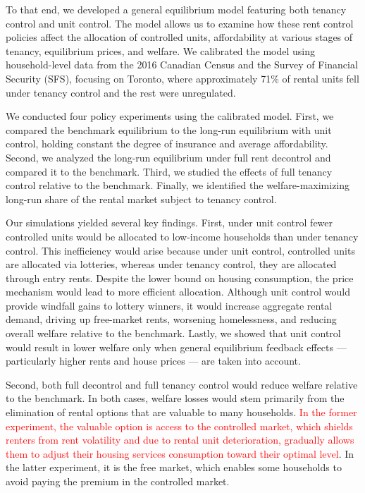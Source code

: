 \documentclass[parskip=full]{article}
\begin{document}
To that end, we developed a general equilibrium model featuring both tenancy control and unit control. The model allows us to examine how these rent control policies affect the allocation of controlled units, affordability at various stages of tenancy, equilibrium prices, and welfare. We calibrated the model using household-level data from the 2016 Canadian Census and the Survey of Financial Security (SFS), focusing on Toronto, where approximately 71\% of rental units fell under tenancy control and the rest were unregulated.

We conducted four policy experiments using the calibrated model. First, we compared the benchmark equilibrium to the long-run equilibrium with unit control, holding constant the degree of insurance and average affordability. Second, we analyzed the long-run equilibrium under full rent decontrol and compared it to the benchmark. Third, we studied the effects of full tenancy control relative to the benchmark. Finally, we identified the welfare-maximizing long-run share of the rental market subject to tenancy control.

Our simulations yielded several key findings. First, under unit control fewer controlled units would be allocated to low-income households than under tenancy control. This inefficiency would arise because under unit control, controlled units are allocated via lotteries, whereas under tenancy control, they are allocated through entry rents. Despite the lower bound on housing consumption, the price mechanism would lead to more efficient allocation. Although unit control would provide windfall gains to lottery winners, it would increase aggregate rental demand, driving up free-market rents, worsening homelessness, and reducing overall welfare relative to the benchmark. Lastly, we showed that unit control would result in lower welfare only when general equilibrium feedback effects — particularly higher rents and house prices — are taken into account.

Second, both full decontrol and full tenancy control would reduce welfare relative to the benchmark. In both cases, welfare losses would stem primarily from the elimination of rental options that are valuable to many households. \textcolor{red}{In the former experiment, the valuable option is access to the controlled market, which shields renters from rent volatility and due to rental unit deterioration, gradually allows them to adjust their housing services consumption toward their optimal level}. In the latter experiment, it is the free market, which enables some households to avoid paying the premium in the controlled market.
\end{document}

